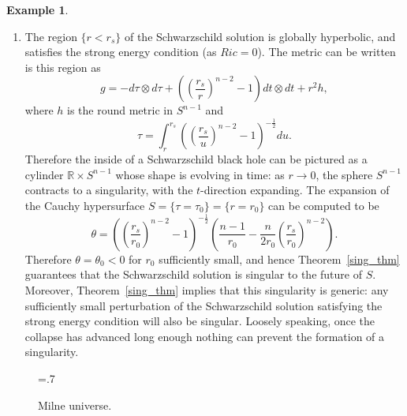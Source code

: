 \documentclass[10pt]{amsart}
\newcommand{\bbR}{\mathbb{R}}      %
\theoremstyle{definition}
\newtheorem{Example}[Thm]{Example}
\theoremstyle{remark}
\begin{document}
\begin{Example}
\begin{enumerate}
\item
The region $\{ r < r_s \}$ of the Schwarzschild solution is globally hyperbolic, and satisfies the strong energy condition (as $Ric=0$). The metric can be written is this region as
\[
g = - d\tau \otimes d\tau + \left( \left(\frac{r_s}r \right)^{n-2} - 1 \right) dt \otimes dt + r^2 h,
\]
where $h$ is the round metric in $S^{n-1}$ and
\[
\tau = \int_r^{r_s} \left( \left(\frac{r_s}u \right)^{n-2} - 1 \right)^{-\frac12} du.
\]
Therefore the inside of a Schwarzschild black hole can be pictured as a cylinder $\bbR \times S^{n-1}$ whose shape is evolving in time: as $r \to 0$, the sphere $S^{n-1}$ contracts to a singularity, with the $t$-direction expanding. The expansion of the Cauchy hypersurface $S = \{ \tau=\tau_0 \} = \{ r=r_0 \}$ can be computed to be
\[
\theta = \left( \left(\frac{r_s}{r_0} \right)^{n-2} - 1 \right)^{-\frac12}\left( \frac{n-1}{r_0} - \frac{n}{2r_0} \left(\frac{r_s}{r_0} \right)^{n-2} \right).
\]
Therefore $\theta = \theta_0 < 0$ for $r_0$ sufficiently small, and hence Theorem~\ref{sing_thm} guarantees that the Schwarzschild solution is singular to the future of $S$. Moreover, Theorem~\ref{sing_thm} implies that this singularity is generic: any sufficiently small perturbation of the Schwarzschild solution satisfying the strong energy condition will also be singular. Loosely speaking, once the collapse has advanced long enough nothing can prevent the formation of a singularity.
\end{enumerate}
\end{Example}

\begin{figure}[h!]
\begin{center}
\epsfxsize=.7\textwidth
\leavevmode
{}
\end{center}
\caption{Milne universe.} \label{Milne}
\end{figure}
%
%
\end{document}
